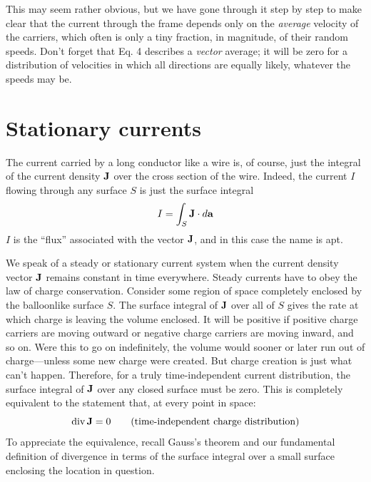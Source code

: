 This may seem rather obvious, but we have gone through it step
by step to make clear that the current through the frame depends
only on the \emph{average} velocity of the carriers, which often is only a tiny
fraction, in magnitude, of their random speeds. Don't forget that
Eq. 4 describes a \emph{vector} average; it will be zero for a distribution of
velocities in which all directions are equally likely, whatever the
speeds may be.

\section{Stationary currents}
The current carried by a long conductor like a wire is, of course,
just the integral of the current density $\mathbf{J}$ over the cross section of the
wire. Indeed, the current $I$ flowing through any surface $S$ is just the
surface integral
\begin{equation}
  I = \int_S \mathbf{J}\cdot d\mathbf{a}
\end{equation}
$I$ is the ``flux'' associated with the vector $\mathbf{J}$, and in this case the name
is apt.

We speak of a steady or stationary current system when the current
density vector $\mathbf{J}$ remains constant in time everywhere. Steady
currents have to obey the law of charge conservation. Consider
some region of space completely enclosed by the balloonlike surface
$S$. The surface integral of $\mathbf{J}$ over all of $S$ gives the rate at which
charge is leaving the volume enclosed. It will be positive if positive
charge carriers are moving outward or negative charge carriers are
moving inward, and so on. Were this to go on indefinitely, the volume
would sooner or later run out of charge---unless some new
charge were created. But charge creation is just what can't happen.
Therefore, for a truly time-independent current distribution, the
surface integral of $\mathbf{J}$ over any closed surface must be zero. This is
completely equivalent to the statement that, at every point in space:
\begin{equation}
  \operatorname{div}\mathbf{J}=0 \qquad \text{(time-independent charge distribution)}
\end{equation}
To appreciate the equivalence, recall Gauss's theorem and our fundamental
definition of divergence in terms of the surface integral
over a small surface enclosing the location in question.

